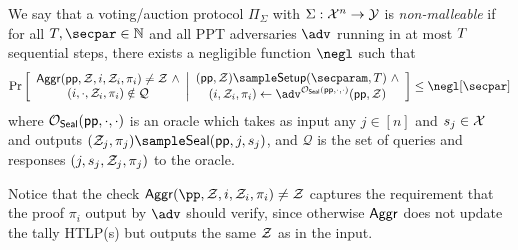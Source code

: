 \begin{definition}\label{def:non_malleability}
We say that a voting/auction protocol $\Pi_\Sigma$ with $\Sigma: \mathcal{X}^n \to \mathcal{Y}$ is \emph{non-malleable} if for all $\Ttime,\secpar \in \mathbb{N}$ and all PPT adversaries $\adv$ running in at most $T$ sequential steps, there exists a negligible function $\negl$ such that %
\begin{align*}
    \Pr\left[
        \begin{array}{c}
        \Aggr(\pparam, \Z, i, \Z_i, \pi_i) \neq \Z~\land\\
        (i, \cdot, \Z_i, \pi_i) \notin \mathcal{Q}
        \end{array}
        \middle|
        \begin{array}{c}
            (\pparam, \Z) \sample \Setup(\secparam, \Ttime)~\land\\
            (i, \Z_i, \pi_i) \gets \adv^{\oracle_\Seal(\pparam,\cdot,\cdot)}(\pparam, \Z)
        \end{array}
    \right]
    \leq \negl[\secpar]
\end{align*}
where $\mathcal{O}_{\mathsf{Seal}}(\mathsf{pp}, \cdot,\cdot)$ is an oracle which takes as input any $j \in [n]$ and $s_j \in \mathcal{X}$ and outputs $(\Z_j, \pi_j) \sample \Seal(\pparam, j, s_j)$, and $\mathcal{Q}$ is the set of queries and responses $(j, s_j, \mathcal{Z}_j, \pi_j)$ to the oracle.
\end{definition}

Notice that the check $\Aggr(\pp, \Z, i, \Z_i, \pi_i) \neq \Z$ captures the requirement that the proof $\pi_i$ output by $\adv$ should verify, since otherwise $\mathsf{Aggr}$ does not update the tally HTLP(s) but outputs the same $\mathcal{Z}$ as in the input.